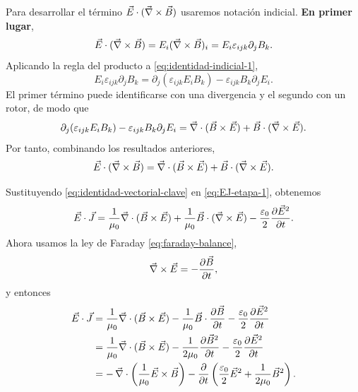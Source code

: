 \documentclass[../main.tex]{subfiles}
\begin{document}
Para desarrollar el término $\vec{E}\cdot(\vec\nabla\times\vec{B})$ usaremos notación indicial. \textbf{En primer lugar},
\begin{equation}
    \vec{E}\cdot(\vec\nabla\times\vec{B})=E_i(\vec\nabla\times\vec{B})_i
    =E_i\varepsilon_{ijk}\partial_j B_k.
    \label{eq:identidad-indicial-1}
\end{equation}
Aplicando la regla del producto a \eqref{eq:identidad-indicial-1},
\begin{equation*}
    E_i\varepsilon_{ijk}\partial_j B_k
    =
    \partial_j(\varepsilon_{ijk}E_iB_k)
    -
    \varepsilon_{ijk}B_k\partial_j E_i.
\end{equation*}
El primer término puede identificarse con una divergencia y el segundo con un rotor, de modo que
\begin{equation*}
    \partial_j(\varepsilon_{ijk}E_iB_k)
    -
    \varepsilon_{ijk}B_k\partial_j E_i
    =
    \vec\nabla\cdot(\vec{B}\times\vec{E})+\vec{B}\cdot(\vec\nabla\times\vec{E}).
\end{equation*}
Por tanto, combinando los resultados anteriores,
\begin{equation}
    \vec{E}\cdot(\vec\nabla\times\vec{B})
    =
    \vec\nabla\cdot(\vec{B}\times\vec{E})+\vec{B}\cdot(\vec\nabla\times\vec{E}).
    \label{eq:identidad-vectorial-clave}
\end{equation}

Sustituyendo \eqref{eq:identidad-vectorial-clave} en \eqref{eq:EJ-etapa-1}, obtenemos
\begin{equation*}
    \vec{E}\cdot\vec{J}
    =
    \frac{1}{\mu_0}\vec\nabla\cdot(\vec{B}\times\vec{E})
    +
    \frac{1}{\mu_0}\vec{B}\cdot(\vec\nabla\times\vec{E})
    -
    \frac{\varepsilon_0}{2}\frac{\partial \vec{E}^2}{\partial t}.
\end{equation*}
Ahora usamos la ley de Faraday \eqref{eq:faraday-balance},
\begin{equation}
    \vec\nabla\times\vec{E}=-\frac{\partial \vec{B}}{\partial t},
    \label{eq:faraday-balance}
\end{equation}
y entonces
\begin{align}
    \vec{E}\cdot\vec{J}
    &=
    \frac{1}{\mu_0}\vec\nabla\cdot(\vec{B}\times\vec{E})
    -
    \frac{1}{\mu_0}\vec{B}\cdot\frac{\partial \vec{B}}{\partial t}
    -
    \frac{\varepsilon_0}{2}\frac{\partial \vec{E}^2}{\partial t}\notag\\
    &=
    \frac{1}{\mu_0}\vec\nabla\cdot(\vec{B}\times\vec{E})
    -
    \frac{1}{2\mu_0}\frac{\partial \vec{B}^2}{\partial t}
    -
    \frac{\varepsilon_0}{2}\frac{\partial \vec{E}^2}{\partial t}\notag\\
    &=
    -\,\vec\nabla\cdot\left(\frac{1}{\mu_0}\vec{E}\times\vec{B}\right)
    -
    \frac{\partial}{\partial t}
    \left(
        \frac{\varepsilon_0}{2}\vec{E}^2+\frac{1}{2\mu_0}\vec{B}^2
    \right).
    \label{eq:EJ-etapa-final}
\end{align}
\end{document}
